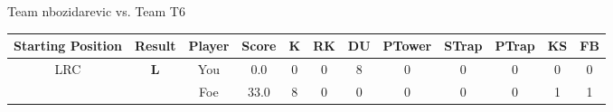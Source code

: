 \documentclass[a4paper,12pt]{article}
\begin{document}
\begin{tabular}[t]{| c | c | c | c | c | c | c | c | c | c | c | c
      |}
                      
      
                      
      
                      
      
                      
      
                      
      
                      
                        \hline
                      \end{tabular}
                      
  \vspace*{2em}
  \par {\large {\color{Gray} Team} nbozidarevic {\color{Gray}
      vs. Team} T6}
  \newline
  \begin{tabular}[t]{| c | c | c | c | c | c | c | c | c | c | c | c
      |}
    \hline
    Starting Position & \textbf{Result} & Player & \textbf{Score} & K & RK & DU & PTower & STrap & PTrap & KS & FB \\
    
      
        \hline
        \multirow{2}{*}{  LRC
             } &
              \multirow{2}{*}{  \textbf{L}  } & 
                    \cellcolor{yellow!25} You & \cellcolor{yellow!25} 0.0 & \cellcolor{yellow!25} 0 &
                    \cellcolor{yellow!25} 0 & \cellcolor{yellow!25} 8 & \cellcolor{yellow!25} 0 &
                    \cellcolor{yellow!25} 0 & \cellcolor{yellow!25} 0 & \cellcolor{yellow!25} 0 &
                    \cellcolor{yellow!25} 0 \\
                    \cline{3-12}
                    & & \cellcolor{red!15} Foe & \cellcolor{red!15} 33.0 & \cellcolor{red!15} 8 & \cellcolor{red!15}
                    0 & \cellcolor{red!15} 0
                    & \cellcolor{red!15} 0 & \cellcolor{red!15}
                    0 & \cellcolor{red!15} 0 
                    & \cellcolor{red!15} 1 & \cellcolor{red!15}
                    1 \\
                    
                      
      
                      
      
                      
      
                      
      
                      
      
                      
      

\end{tabular}
\end{document}

